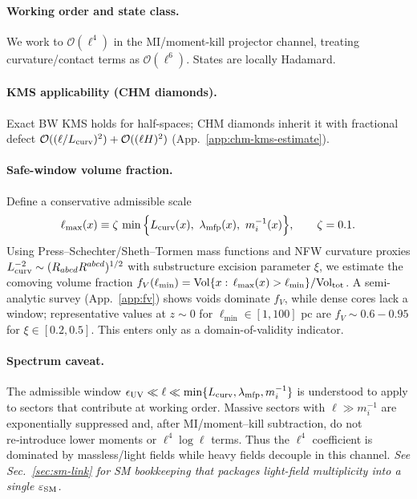 \documentclass[aps,prd,onecolumn,superscriptaddress,nofootinbib]{revtex4-2}
\providecommand{\be}{\begin{equation}}
\providecommand{\ee}{\end{equation}}
\begin{document}
\paragraph{Working order and state class.} We work to \(\mathcal O(\ell^4)\) in the MI/moment-kill projector channel, treating curvature/contact terms as \(\mathcal O(\ell^6)\). States are locally Hadamard.

\paragraph{KMS applicability (CHM diamonds).} Exact BW KMS holds for half-spaces; CHM diamonds inherit it with fractional defect \(\mathcal O((\ell/L_{\rm curv})^2)+\mathcal O((\ell H)^2)\) (App.~\ref{app:chm-kms-estimate}).

\paragraph{Safe-window volume fraction.} Define a conservative admissible scale
\be
\label{eq:lmax}
\ell_{\max}(x)\equiv \zeta\,\min\Big\{L_{\rm curv}(x),\ \lambda_{\rm mfp}(x),\ m_i^{-1}(x)\Big\},\qquad \zeta=0.1.
\ee
Using Press–Schechter/Sheth–Tormen mass functions and NFW curvature proxies \(L_{\rm curv}^{-2}\sim (R_{abcd}R^{abcd})^{1/2}\) with substructure excision parameter \(\xi\), we estimate the comoving volume fraction \(f_V(\ell_{\min})=\mathrm{Vol}\{x:\,\ell_{\max}(x)>\ell_{\min}\}/\mathrm{Vol}_{\rm tot}\). A semi-analytic survey (App.~\ref{app:fv}) shows voids dominate \(f_V\), while dense cores lack a window; representative values at \(z\!\sim\!0\) for \(\ell_{\min}\in[1,100]\) pc are \(f_V\sim 0.6{-}0.95\) for \(\xi\in[0.2,0.5]\). This enters only as a domain-of-validity indicator.

\paragraph{Spectrum caveat.}
The admissible window \(\epsilon_{\rm UV}\ll \ell\ll\min\{L_{\rm curv},\lambda_{\rm mfp},m_i^{-1}\}\) is understood to apply to sectors that contribute at working order. Massive sectors with \(\ell\gg m_i^{-1}\) are exponentially suppressed and, after MI/moment–kill subtraction, do not re‑introduce lower moments or \(\ell^4\log\ell\) terms. Thus the \(\ell^4\) coefficient is dominated by massless/light fields while heavy fields decouple in this channel. \emph{See Sec.~\ref{sec:sm-link} for SM bookkeeping that packages light-field multiplicity into a single \(\varepsilon_{\rm SM}\).}
\end{document}
